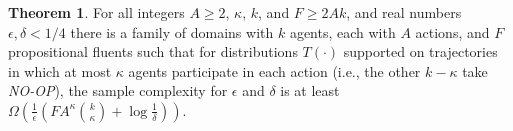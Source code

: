 \documentclass[letterpaper]{article} %
\theoremstyle{definition}
\newtheorem{theorem}{Theorem}
\theoremstyle{remark}
\newcommand{\noop}{\textit{NO-OP}\xspace}
\begin{document}
\begin{theorem}
For all integers $A\geq 2$, $\kappa$, $k$, and $F\geq 2Ak$, and real numbers $\epsilon,\delta < 1/4$ there is a family of domains with $k$ agents, each with $A$ actions, and $F$ propositional fluents such that for distributions $T(\cdot)$ supported on trajectories in which at most $\kappa$ agents participate in each action (i.e., the other $k-\kappa$ take \noop), the sample complexity for $\epsilon$ and $\delta$ is at least $\Omega\left(\frac{1}{\epsilon}(FA^{\kappa}{k\choose\kappa}+\log\frac{1}{\delta})\right)$.
\end{theorem}

\end{document}
